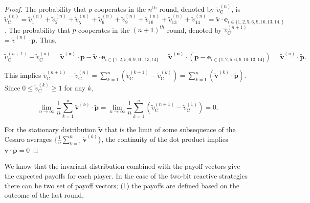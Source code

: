 \documentclass{article}
\theoremstyle{definition}
\begin{document}
\begin{proof}
  The probability that \(p\) cooperates in the \(n^{\text{th}}\) round, denoted
  by \(\tilde{v}_{\text{C}}^{(n)}\), is \(\tilde{v}_{\text{C}}^{(n)} = \tilde{v}_{1}^{(n)} +
  \tilde{v}_{2}^{(n)} + \tilde{v}_{5}^{(n)} + \tilde{v}_{6}^{(n)} + \tilde{v}_{9}^{(n)} +  \tilde{v}_{10}^{(n)} +
  \tilde{v}_{13}^{(n)} + \tilde{v}_{14}^{(n)} = \mathbf{\tilde{v}} \cdot \mathbf{e}_{i \in \{1, 2,
  5, 6, 9, 10, 13, 14,\}}\). The probability that \(p\) cooperates in the
  \((n + 1)^{th}\) round, denoted by \(\tilde{v}_{\text{C}}^{(n + 1)}\) = \(\tilde{v}^{(n)} \cdot \mathbf{p}\).
  Thus,

  \begin{equation*}
   \tilde{v}_{\text{C}}^{(n + 1)} - \tilde{v}_{\text{C}}^{(n)} = \mathbf{\tilde{v}^{(n)}} \cdot \mathbf{p} - \mathbf{\tilde{v}} \cdot \mathbf{e}_{i \in \{1, 2,
    5, 6, 9, 10, 13, 14\}} = \mathbf{\tilde{v}^{(n)}} \cdot (\mathbf{p} - \mathbf{e}_{i \in \{1, 2,
    5, 6, 9, 10, 13, 14\}}) = \mathbf{\tilde{v}}^{(n)} \cdot \mathbf{\tilde{p}}.
  \end{equation*}

  This implies \(\tilde{v}_{\text{C}}^{(n + 1)} - \tilde{v}_{\text{C}}^{(n)}
  = \sum_{k=1}^{n} (\tilde{v}_{\text{C}}^{(k + 1)} - \tilde{v}_{\text{C}}^{(k)})
  = \sum_{k=1}^{n} (\mathbf{\tilde{v}}^{(k)} \cdot \mathbf{\tilde{p}})\). Since
  \(0 \leq \tilde{v}_{\text{C}}^{(k)} \geq 1\) for any \(k\),

  \begin{equation*}
    \lim_{n \rightarrow \infty} \frac{1}{n} \sum_{k=1}^{n} \mathbf{\tilde{v}}^{(k)} \cdot \mathbf{\tilde{p}} = 
    \lim_{n \rightarrow \infty} \frac{1}{n} \sum_{k=1}^{n} (\tilde{v}_{\text{C}}^{(n + 1)} - \tilde{v}_{\text{C}}^{(1)}) = 0.
  \end{equation*}

  For the stationary distribution \(\mathbf{\tilde{v}}\) that is the limit of
  some subsequence of the Cesaro averages \(\{\frac{1}{n} \sum_{k=1}^{n} \mathbf{\tilde{v}}^{(k)}\}\),
  the continuity of the dot product implies \(\mathbf{\tilde{v}} \cdot \mathbf{\tilde{p}} = 0 \)

\end{proof}

We know that the invariant distribution combined with the payoff vectors give
the expected payoffs for each player. In the case of the two-bit reactive
strategies there can be two set of payoff vectors; (1) the payoffs are
defined based on the outcome of the last round,
\end{document}
